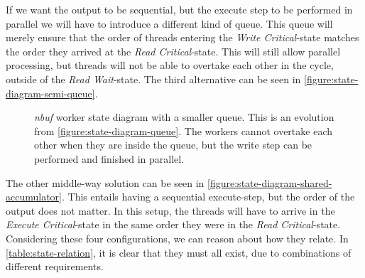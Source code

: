\documentclass[a4paper]{article}
\newcommand{\nbuf}{\textit{nbuf} }
\begin{document}
If we want the output to be sequential, but the execute step to be performed in parallel we will have to introduce a different kind of queue. This queue will merely ensure that the order of threads entering the \textit{Write Critical}-state matches the order they arrived at the \textit{Read Critical}-state. This will still allow parallel processing, but threads will not be able to overtake each other in the cycle, outside of the \textit{Read Wait}-state. The third alternative can be seen in \autoref{figure:state-diagram-semi-queue}.

\begin{figure}
	\begin{adjustwidth}{-0.5in}{-0.5in}
    \centering
    \def\svgwidth{\columnwidth}
    
  	\caption{\nbuf worker state diagram with a smaller queue. This is an evolution from \autoref{figure:state-diagram-queue}. The workers cannot overtake each other when they are inside the queue, but the write step can be performed and finished in parallel.}
	\label{figure:state-diagram-shared-accumulator}
	\end{adjustwidth}
\end{figure}

The other middle-way solution can be seen in \autoref{figure:state-diagram-shared-accumulator}. This entails having a sequential execute-step, but the order of the output does not matter. In this setup, the threads will have to arrive in the \textit{Execute Critical}-state in the same order they were in the \textit{Read Critical}-state.\\

Considering these four configurations, we can reason about how they relate. In \autoref{table:state-relation}, it is clear that they must all exist, due to combinations of different requirements.\\
\end{document}
